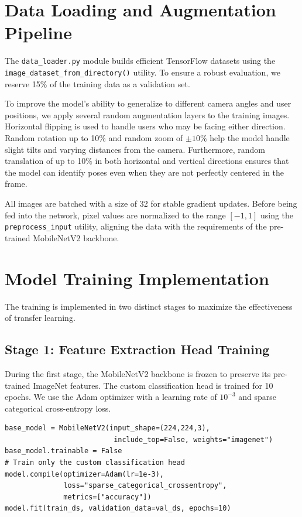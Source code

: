 \section{Data Loading and Augmentation Pipeline}
The \texttt{data\_loader.py} module builds efficient TensorFlow datasets using the \texttt{image\_dataset\_from\_directory()} utility. To ensure a robust evaluation, we reserve 15\% of the training data as a validation set.

To improve the model's ability to generalize to different camera angles and user positions, we apply several random augmentation layers to the training images. Horizontal flipping is used to handle users who may be facing either direction. Random rotation up to 10\% and random zoom of $\pm 10\%$ help the model handle slight tilts and varying distances from the camera. Furthermore, random translation of up to 10\% in both horizontal and vertical directions ensures that the model can identify poses even when they are not perfectly centered in the frame.

All images are batched with a size of 32 for stable gradient updates. Before being fed into the network, pixel values are normalized to the range $[-1, 1]$ using the \texttt{preprocess\_input} utility, aligning the data with the requirements of the pre-trained MobileNetV2 backbone.

\section{Model Training Implementation}
The training is implemented in two distinct stages to maximize the effectiveness of transfer learning.

\subsection{Stage 1: Feature Extraction Head Training}
During the first stage, the MobileNetV2 backbone is frozen to preserve its pre-trained ImageNet features. The custom classification head is trained for 10 epochs. We use the Adam optimizer with a learning rate of $10^{-3}$ and sparse categorical cross-entropy loss.
\begin{verbatim}
base_model = MobileNetV2(input_shape=(224,224,3),
                          include_top=False, weights="imagenet")
base_model.trainable = False
# Train only the custom classification head
model.compile(optimizer=Adam(lr=1e-3),
              loss="sparse_categorical_crossentropy",
              metrics=["accuracy"])
model.fit(train_ds, validation_data=val_ds, epochs=10)
\end{verbatim}

